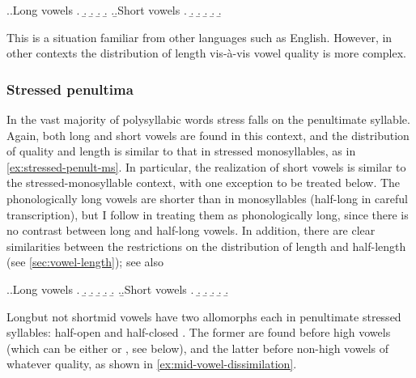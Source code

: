 \ex.\label{ex:penfro-stressed-ms}\a.Long vowels
\a.
\b.
\b.
\b.
\b.
\z.\b.Short vowels
\a.
\b.
\b.
\b.
\b.
\b.

This is a situation familiar from other languages such as English. However, in other contexts the distribution of length vis-à-vis vowel quality is more complex.

\subsubsection{Stressed penultima}
\label{sec:stressed-penultima}

In the vast majority of polysyllabic words stress falls on the penultimate syllable. Again, both long and short vowels are found in this context, and the distribution of quality and length is similar to that in stressed monosyllables, as in \cref{ex:stressed-penult-ms}. In particular, the realization of short vowels is similar to the stressed\hyp monosyllable context, with one exception to be treated below. The phonologically long vowels are shorter than in monosyllables (\ie half-long in careful transcription), but I follow \citet{awbery86:_pembr_welsh} in treating them as phonologically long, since there is no contrast between long and half-long vowels. In addition, there are clear similarities between the restrictions on the distribution of length and half-length (see \cref{sec:vowel-length}); see also \citet[pp.~14--15]{wmffre03:_languag_wales}

\ex.\label{ex:stressed-penult-ms}\a.Long vowels
\a.
\b.
\b.
\b.
\b.
\b.
\z.\b.Short vowels
\a.
\b.
\b.
\b.
\b.
\b.

Long\dash but not short\dash mid vowels have two allomorphs each in penultimate stressed syllables: half-open  and half-closed . The former are found before high vowels (which can be either  or , see below), and the latter before non-high vowels of whatever quality, as shown in \cref{ex:mid-vowel-dissimilation}.


